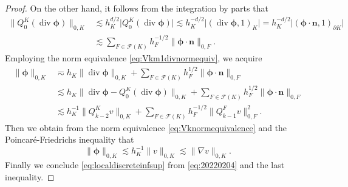 \documentclass[10pt]{amsart}
\renewcommand{\div}{\operatorname{div}}
\numberwithin{equation}{section}
\begin{document}
\begin{proof}
On the other hand, it follows from the integration by parts that
\begin{align*}
\|Q_0^K(\div\boldsymbol{\phi})\|_{0,K}&\lesssim h_{K}^{d/2}\big|Q_0^K(\div\boldsymbol{\phi})\big|\lesssim h_{K}^{-d/2}\big|(\div\boldsymbol{\phi},1)_{K}\big|=h_{K}^{-d/2}\big|(\boldsymbol{\phi}\cdot\boldsymbol{n},1)_{\partial K}\big| \\
&\lesssim \sum_{F\in\mathcal F(K)}h_F^{-1/2}\|\boldsymbol{\phi}\cdot\boldsymbol{n}\|_{0,F}.
\end{align*}
Employing the norm equivalence \eqref{eq:Vkm1divnormequiv},
we acquire
\begin{align*}
\|\boldsymbol{\phi}\|_{0,K}&\eqsim h_K\|\div\boldsymbol{\phi}\|_{0,K} +\sum_{F\in\mathcal F(K)}h_F^{1/2}\|\boldsymbol{\phi}\cdot\boldsymbol{n}\|_{0,F} \\
&\lesssim h_K\|\div\boldsymbol{\phi}-Q_0^K(\div\boldsymbol{\phi})\|_{0,K} +\sum_{F\in\mathcal F(K)}h_F^{1/2}\|\boldsymbol{\phi}\cdot\boldsymbol{n}\|_{0,F} \\
&\lesssim h_K^{-1}\|Q_{k-2}^Kv\|_{0,K} +\sum_{F\in\mathcal F(K)}h_F^{-1/2}\|Q_{k-1}^Fv\|_{0,F}^2.    
\end{align*}
Then we obtain from the norm equivalence \eqref{eq:Vknormequivalence} and the Poincar\'e-Friedrichs  inequality \cite[(2.14)]{BrennerSung2018} that
\[
\|\boldsymbol{\phi}\|_{0,K}\lesssim h_K^{-1}\|v\|_{0,K}\lesssim \|\nabla v\|_{0,K}.    
\]
Finally we conclude \eqref{eq:localdiscreteinfsup} from \eqref{eq:20220204} and the last inequality.
\end{proof}
\end{document}
